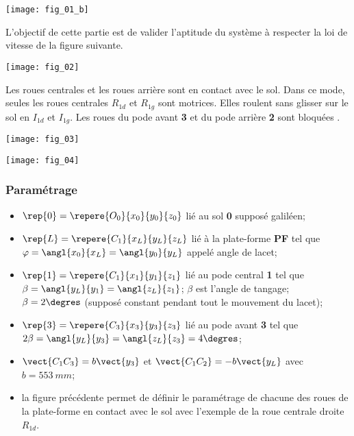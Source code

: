 \begin{multicols}{2}
\begin{center}
\texttt{[image: fig\_01\_b]}
\end{center}

L’objectif de cette partie est de valider l’aptitude du système à respecter la
loi de vitesse de la figure suivante.

\begin{center}
\texttt{[image: fig\_02]}
\end{center}


Les roues centrales et les roues arrière sont en contact avec le sol. Dans ce
mode, seules les roues centrales $R_{1d}$ et $R_{1g}$ sont motrices. Elles roulent
sans glisser sur le sol en $I_{1d}$ et $I_{1g}$. Les roues du pode avant \textbf{3} et du pode
arrière \textbf{2} sont bloquées .


\begin{center}
\texttt{[image: fig\_03]}
\end{center}


\begin{center}
\texttt{[image: fig\_04]}
\end{center}

\subsubsection*{Paramétrage}%
\begin{itemize}
\item $\rep{0}=\repere{O_0}{x_0}{y_0}{z_0}$ lié au sol \textbf{0} supposé galiléen;
\item $\rep{L}=\repere{C_1}{x_L}{y_L}{z_L}$ lié à la plate-forme \textbf{PF} tel que $\varphi=\angl{x_0}{x_L}=\angl{y_0}{y_L}$ appelé angle de lacet;
\item $\rep{1}=\repere{C_1}{x_1}{y_1}{z_1}$ lié au pode central \textbf{1} tel que $\beta=\angl{y_L}{y_1}=\angl{z_L}{z_1}$; $\beta$ est l'angle de tangage; $\beta=2\degres$ (supposé constant pendant tout le mouvement du lacet);
\item $\rep{3}=\repere{C_3}{x_3}{y_3}{z_3}$ lié au pode avant \textbf{3} tel que $2\beta=\angl{y_L}{y_3}=\angl{z_L}{z_3}=4\degres$; 
\item $\vect{C_1C_3}=b\vect{y_3}$ et $\vect{C_1C_2}=-b\vect{y_L}$ avec $b=\SI{553}{mm}$; 
\item la figure précédente permet de définir le paramétrage de chacune des roues de la plate-forme en contact avec le sol avec l’exemple de la roue centrale droite $R_{1d}$.
\end{itemize}


\end{multicols}
